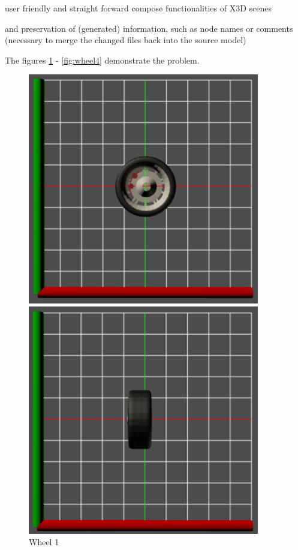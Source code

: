 \begin{itemize*}
\item user friendly and straight forward compose functionalities of X3D scenes
\item and preservation of (generated) information, such as node names or comments (necessary to merge the changed files back into the source model)
\end{itemize*}

The figures \ref{fig:wheel1} - \ref{fig:wheel4} demonstrate the problem.

\begin{figure}[htbp]
  \begin{minipage}{.5\textwidth}
    \includegraphics[width=0.9\textwidth]{../assets/wheel1.png}
  	\caption{Wheel 1}
  	\label{fig:wheel1}
  \end{minipage}
  \begin{minipage}{.5\textwidth}
  	\includegraphics[width=0.9\textwidth]{../assets/wheel2.png}

\end{minipage}
\end{figure}
